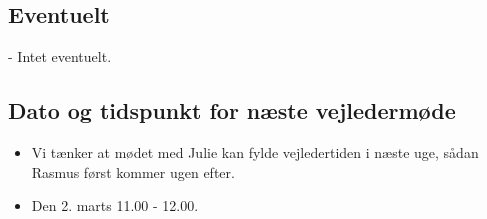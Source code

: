 \subsection{Eventuelt}
- Intet eventuelt.

\subsection{Dato og tidspunkt for næste vejledermøde}
    \begin{itemize}
        \item Vi tænker at mødet med Julie kan fylde vejledertiden i næste uge, sådan Rasmus først kommer ugen efter.
        \item Den 2. marts 11.00 - 12.00.
    \end{itemize}